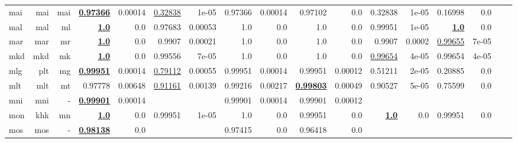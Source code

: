 \documentclass[11pt]{article}
\begin{document}
\begin{table*}[h]
{\begin{tabular}{lrrrrrrrrrrrrrrrr}
mai         & mai         & mai         & \textbf{\underline{0.97366}}         & 0.00014         & \underline{0.32838}         & 1e-05         & 0.97366         & 0.00014         & 0.97102         & 0.0         & 0.32838         & 1e-05         & 0.16998         & 0.0         \\
mal         & mal         & ml         & \textbf{\underline{1.0}}         & 0.0         & 0.97683         & 0.00053         & 1.0         & 0.0         & 1.0         & 0.0         & 0.99951         & 1e-05         & \textbf{\underline{1.0}}         & 0.0         \\
mar         & mar         & mr         & \textbf{\underline{1.0}}         & 0.0         & 0.9907         & 0.00021         & 1.0         & 0.0         & 1.0         & 0.0         & 0.9907         & 0.0002         & \underline{0.99655}         & 7e-05         \\
mkd         & mkd         & mk         & \textbf{\underline{1.0}}         & 0.0         & 0.99556         & 7e-05         & 1.0         & 0.0         & 1.0         & 0.0         & \underline{0.99654}         & 4e-05         & 0.99654         & 4e-05         \\
mlg         & plt         & mg         & \textbf{\underline{0.99951}}         & 0.00014         & \underline{0.79112}         & 0.00055         & 0.99951         & 0.00014         & 0.99951         & 0.00012         & 0.51211         & 2e-05         & 0.20885         & 0.0         \\
mlt         & mlt         & mt         & 0.97778         & 0.00648         & \underline{0.91161}         & 0.00139         & 0.99216         & 0.00217         & \textbf{\underline{0.99803}}         & 0.00049         & 0.90527         & 5e-05         & 0.75599         & 0.0         \\
mni         & mni         & -         & \textbf{\underline{0.99901}}         & 0.00014         &          &          & 0.99901         & 0.00014         & 0.99901         & 0.00012         &          &          &          &          \\
mon         & khk         & mn         & \textbf{\underline{1.0}}         & 0.0         & 0.99951         & 1e-05         & 1.0         & 0.0         & 0.99951         & 0.0         & \textbf{\underline{1.0}}         & 0.0         & 0.99951         & 0.0         \\
mos         & mos         & -         & \textbf{\underline{0.98138}}         & 0.0         &          &          & 0.97415         & 0.0         & 0.96418         & 0.0         &          &          &          &          \\

\end{tabular}}
\end{table*}
\end{document}
